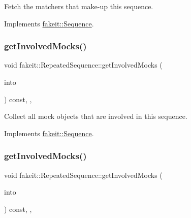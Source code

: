 Fetch the matchers that make-\/up this sequence. 



Implements \mbox{\hyperlink{classfakeit_1_1Sequence_aa1a1e4ad2fcac3379ba38f250bf06884}{fakeit\+::\+Sequence}}.

\mbox{\label{classfakeit_1_1RepeatedSequence_a4271add0945bdf443562df683e77777d}} 
\subsubsection{\texorpdfstring{getInvolvedMocks()}{getInvolvedMocks()}\hspace{0.1cm}{\footnotesize\ttfamily [1/9]}}
{\footnotesize\ttfamily void fakeit\+::\+Repeated\+Sequence\+::get\+Involved\+Mocks (\begin{DoxyParamCaption}\item[{std\+::vector$<$ \mbox{\hyperlink{structfakeit_1_1ActualInvocationsSource}{Actual\+Invocations\+Source}} $\ast$ $>$ \&}]{into }\end{DoxyParamCaption}) const\hspace{0.3cm}{\ttfamily [inline]}, {\ttfamily [override]}, {\ttfamily [virtual]}}



Collect all mock objects that are involved in this sequence. 



Implements \mbox{\hyperlink{classfakeit_1_1Sequence_a4af96a0de0fa659fe826431e4d61757a}{fakeit\+::\+Sequence}}.

\mbox{\label{classfakeit_1_1RepeatedSequence_a4271add0945bdf443562df683e77777d}} 
\subsubsection{\texorpdfstring{getInvolvedMocks()}{getInvolvedMocks()}\hspace{0.1cm}{\footnotesize\ttfamily [2/9]}}
{\footnotesize\ttfamily void fakeit\+::\+Repeated\+Sequence\+::get\+Involved\+Mocks (\begin{DoxyParamCaption}\item[{std\+::vector$<$ \mbox{\hyperlink{structfakeit_1_1ActualInvocationsSource}{Actual\+Invocations\+Source}} $\ast$ $>$ \&}]{into }\end{DoxyParamCaption}) const\hspace{0.3cm}{\ttfamily [inline]}, {\ttfamily [override]}, {\ttfamily [virtual]}}



